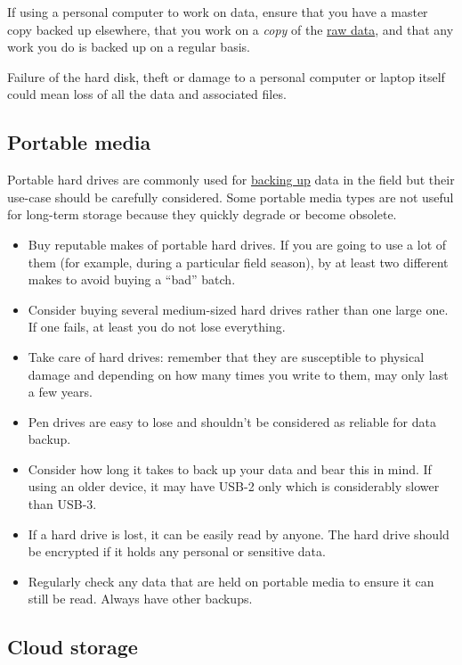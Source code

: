 \documentclass[12pt,a4paper,oneside]{report}
\providecommand{\tightlist}{%
  \setlength{\itemsep}{0pt}\setlength{\parskip}{0pt}}
\begin{document}
If using a personal computer to work on data, ensure that you have a
master copy backed up elsewhere, that you work on a \emph{copy} of the
\protect\hyperlink{working-on-your-data}{raw data}, and that any work
you do is backed up on a regular basis.

Failure of the hard disk, theft or damage to a personal computer or
laptop itself could mean loss of all the data and associated files.

\hypertarget{portable-media}{%
\subsection{Portable media}\label{portable-media}}

Portable hard drives are commonly used for
\protect\hyperlink{data-backup}{backing up} data in the field but their
use-case should be carefully considered. Some portable media types are
not useful for long-term storage because they quickly degrade or become
obsolete.

\begin{itemize}
\tightlist
\item
  Buy reputable makes of portable hard drives. If you are going to use a
  lot of them (for example, during a particular field season), by at
  least two different makes to avoid buying a ``bad'' batch.
\item
  Consider buying several medium-sized hard drives rather than one large
  one. If one fails, at least you do not lose everything.
\item
  Take care of hard drives: remember that they are susceptible to
  physical damage and depending on how many times you write to them, may
  only last a few years.
\item
  Pen drives are easy to lose and shouldn't be considered as reliable
  for data backup.
\item
  Consider how long it takes to back up your data and bear this in mind.
  If using an older device, it may have USB-2 only which is considerably
  slower than USB-3.
\item
  If a hard drive is lost, it can be easily read by anyone. The hard
  drive should be encrypted if it holds any personal or sensitive data.
\item
  Regularly check any data that are held on portable media to ensure it
  can still be read. Always have other backups.
\end{itemize}

\hypertarget{cloud-storage}{%
\subsection{Cloud storage}\label{cloud-storage}}
\end{document}
